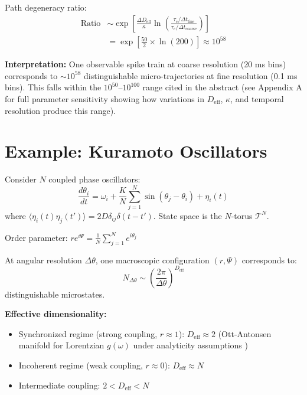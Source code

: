 \documentclass[12pt]{article}
\numberwithin{equation}{section}
\begin{document}
Path degeneracy ratio:
\begin{align}
\text{Ratio} &\sim \exp\left[\frac{\Delta D_{\text{eff}}}{\kappa} \ln\left(\frac{\tau_c/\Delta t_{\text{fine}}}{\tau_c/\Delta t_{\text{coarse}}}\right)\right] \nonumber\\
&= \exp\left[\frac{50}{2} \times \ln(200)\right] \approx 10^{58}
\end{align}

\textbf{Interpretation:} One observable spike train at coarse resolution (20 ms bins) corresponds to $\sim 10^{58}$ distinguishable micro-trajectories at fine resolution (0.1 ms bins). This falls within the $10^{50}$--$10^{100}$ range cited in the abstract (see Appendix A for full parameter sensitivity showing how variations in $D_{\text{eff}}$, $\kappa$, and temporal resolution produce this range).

\section{Example: Kuramoto Oscillators}

Consider $N$ coupled phase oscillators:
\begin{equation}
\frac{d\theta_i}{dt} = \omega_i + \frac{K}{N}\sum_{j=1}^N \sin(\theta_j - \theta_i) + \eta_i(t)
\end{equation}
where $\langle\eta_i(t)\eta_j(t')\rangle = 2D\delta_{ij}\delta(t-t')$. State space is the $N$-torus $\mathcal{T}^N$.

Order parameter: $r e^{i\Psi} = \frac{1}{N}\sum_{j=1}^N e^{i\theta_j}$

At angular resolution $\Delta\theta$, one macroscopic configuration $(r, \Psi)$ corresponds to:
\begin{equation}
N_{\Delta\theta} \sim \left(\frac{2\pi}{\Delta\theta}\right)^{D_{\text{eff}}}
\end{equation}
distinguishable microstates.

\textbf{Effective dimensionality:}
\begin{itemize}
\item Synchronized regime (strong coupling, $r \approx 1$): $D_{\text{eff}} \approx 2$ (Ott-Antonsen manifold for Lorentzian $g(\omega)$ under analyticity assumptions \cite{ott2008,ott2009})
\item Incoherent regime (weak coupling, $r \approx 0$): $D_{\text{eff}} \approx N$
\item Intermediate coupling: $2 < D_{\text{eff}} < N$
\end{itemize}
\end{document}
